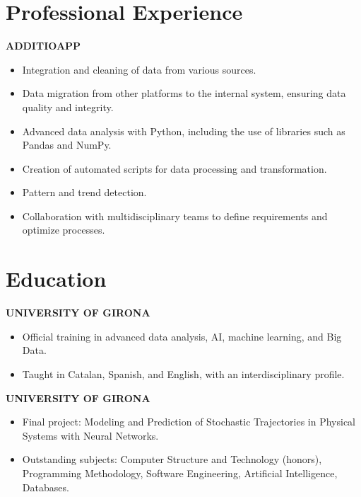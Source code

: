 \documentclass[11pt,a4paper]{article}
\newcommand{\runsubsection}[1]{\color{subheadings}\fontsize{12pt}{12pt}\selectfont\bfseries\uppercase{#1}\normalfont}
\newcommand{\descript}[1]{\color{subheadings}\raggedright\scshape\fontsize{11pt}{13pt}\selectfont{#1 \\}\normalfont}
\newcommand{\location}[1]{\color{headings}\raggedright\fontsize{10pt}{12pt}\selectfont{#1\\}\normalfont}
\newcommand{\sectionsep}{\vspace{8pt}}
\newenvironment{tightemize}{\vspace{-\topsep}\begin{itemize}\itemsep1pt \parskip0pt \parsep0pt}{\end{itemize}\vspace{-\topsep}}
\begin{document}
\begin{multicols}{2}

\section{Professional Experience}

\runsubsection{AdditioApp}
\descript{Data Science}
\location{October 2024 – Present | Girona}
\sectionsep
\begin{tightemize}
    \item Integration and cleaning of data from various sources.
    \item Data migration from other platforms to the internal system, ensuring data quality and integrity.
    \item Advanced data analysis with Python, including the use of libraries such as Pandas and NumPy.
    \item Creation of automated scripts for data processing and transformation.
    \item Pattern and trend detection.
    \item Collaboration with multidisciplinary teams to define requirements and optimize processes.
\end{tightemize}
\sectionsep


\section{Education}

\runsubsection{University of Girona}

\descript{Master's Degree in Data Science}
\location{2025 – 2026 (ongoing) | Girona}
\sectionsep
\begin{tightemize}
\item Official training in advanced data analysis, AI, machine learning, and Big Data.
\item Taught in Catalan, Spanish, and English, with an interdisciplinary profile.
\end{tightemize}
\sectionsep

\runsubsection{University of Girona}

\descript{Bachelor's Degree in Computer Engineering}
\location{2021 – 2025 | Girona}
\sectionsep
\begin{tightemize}
\item Final project: Modeling and Prediction of Stochastic Trajectories in Physical Systems with Neural Networks.
\item Outstanding subjects: Computer Structure and Technology (honors), Programming Methodology, Software Engineering, Artificial Intelligence, Databases.
\end{tightemize}
\sectionsep


\end{multicols}
\end{document}
